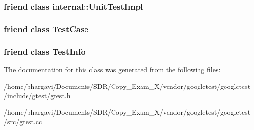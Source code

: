 \subsubsection[{\texorpdfstring{internal\+::\+Unit\+Test\+Impl}{internal::UnitTestImpl}}]{\setlength{\rightskip}{0pt plus 5cm}friend class {\bf internal\+::\+Unit\+Test\+Impl}\hspace{0.3cm}{\ttfamily [friend]}}\hypertarget{classtesting_1_1_test_event_listeners_acc0a5e7573fd6ae7ad1878613bb86853}{}\label{classtesting_1_1_test_event_listeners_acc0a5e7573fd6ae7ad1878613bb86853}
\subsubsection[{\texorpdfstring{Test\+Case}{TestCase}}]{\setlength{\rightskip}{0pt plus 5cm}friend class {\bf Test\+Case}\hspace{0.3cm}{\ttfamily [friend]}}\hypertarget{classtesting_1_1_test_event_listeners_aff779e55b06adfa7c0088bd10253f0f0}{}\label{classtesting_1_1_test_event_listeners_aff779e55b06adfa7c0088bd10253f0f0}
\subsubsection[{\texorpdfstring{Test\+Info}{TestInfo}}]{\setlength{\rightskip}{0pt plus 5cm}friend class {\bf Test\+Info}\hspace{0.3cm}{\ttfamily [friend]}}\hypertarget{classtesting_1_1_test_event_listeners_a4c49c2cdb6c328e6b709b4542f23de3c}{}\label{classtesting_1_1_test_event_listeners_a4c49c2cdb6c328e6b709b4542f23de3c}


The documentation for this class was generated from the following files\+:\begin{DoxyCompactItemize}
\item 
/home/bhargavi/\+Documents/\+S\+D\+R/\+Copy\+\_\+\+Exam\+\_\+X/vendor/googletest/googletest/include/gtest/\hyperlink{gtest_8h}{gtest.\+h}\item 
/home/bhargavi/\+Documents/\+S\+D\+R/\+Copy\+\_\+\+Exam\+\_\+X/vendor/googletest/googletest/src/\hyperlink{gtest_8cc}{gtest.\+cc}\end{DoxyCompactItemize}
